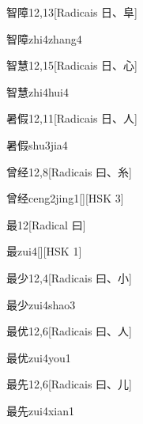 \begin{entry}{智障}{12,13}[Radicais ⽇、⾩]
  \begin{phonetics}{智障}{zhi4zhang4}
  \end{phonetics}
\end{entry}

\begin{entry}{智慧}{12,15}[Radicais ⽇、⼼]
  \begin{phonetics}{智慧}{zhi4hui4}
  \end{phonetics}
\end{entry}

\begin{entry}{暑假}{12,11}[Radicais ⽇、⼈]
  \begin{phonetics}{暑假}{shu3jia4}
  \end{phonetics}
\end{entry}

\begin{entry}{曾经}{12,8}[Radicais ⽈、⽷]
  \begin{phonetics}{曾经}{ceng2jing1}[][HSK 3]
  \end{phonetics}
\end{entry}

\begin{entry}{最}{12}[Radical ⽈]
  \begin{phonetics}{最}{zui4}[][HSK 1]
  \end{phonetics}
\end{entry}

\begin{entry}{最少}{12,4}[Radicais ⽈、⼩]
  \begin{phonetics}{最少}{zui4shao3}
  \end{phonetics}
\end{entry}

\begin{entry}{最优}{12,6}[Radicais ⽈、⼈]
  \begin{phonetics}{最优}{zui4you1}
  \end{phonetics}
\end{entry}

\begin{entry}{最先}{12,6}[Radicais ⽈、⼉]
  \begin{phonetics}{最先}{zui4xian1}
  \end{phonetics}
\end{entry}

